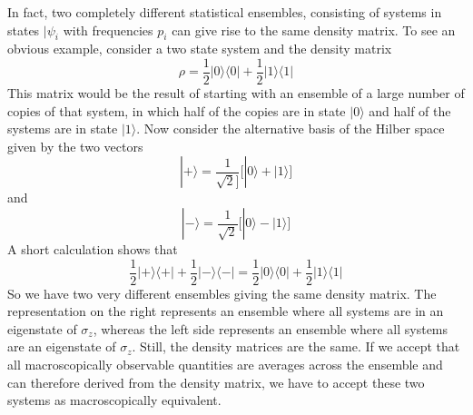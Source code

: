 \documentclass[a4paper, draft]{article}
\theoremstyle{own}
\theoremstyle{remark}
\begin{document}
In fact, two completely different statistical ensembles, consisting of systems in states $|\psi_i$ with frequencies $p_i$ can give rise to the same density matrix. To see an obvious example, consider a two state system and the density matrix
$$
\rho = \frac{1}{2} |0 \rangle \langle 0 | + \frac{1}{2} |1 \rangle \langle 1 |
$$
This matrix would be the result of starting with an ensemble of a large number of copies of that system, in which half of the copies are in state $|0 \rangle$ and half of the systems are in state $|1 \rangle$. Now consider the alternative basis of the Hilber space given by the two vectors
$$
|+ \rangle = \frac{1}{\sqrt{2}]}\big[ |0 \rangle + |1 \rangle \big] 
$$
and
$$
|- \rangle = \frac{1}{\sqrt{2}} \big[ |0 \rangle - |1 \rangle \big] 
$$
A short calculation shows that
$$
\frac{1}{2} | +\rangle \langle +| + \frac{1}{2} | -\rangle \langle -|
=
\frac{1}{2} |0 \rangle \langle 0 | + \frac{1}{2} |1 \rangle \langle 1 |
$$
So we have two very different ensembles giving the same density matrix. The representation on the right represents an ensemble where all systems are in an eigenstate of $\sigma_z$, whereas the left side represents an ensemble where all systems are an eigenstate of $\sigma_z$. Still, the density matrices are the same. If we accept that all macroscopically observable quantities are averages across the ensemble and can therefore derived from the density matrix, we have to accept these two systems as macroscopically equivalent. 
\end{document}
